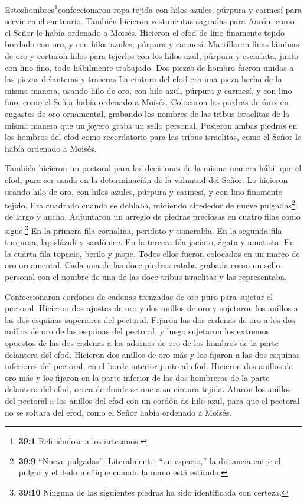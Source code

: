  Estoshombres\footnote{\textbf{39:1} Refiriéndose a los
  artesanos.}confeccionaron ropa tejida con hilos azules, púrpura y
carmesí para servir en el santuario. También hicieron vestimentas
sagradas para Aarón, como el Señor le había ordenado a Moisés.
 Hicieron el efod de lino finamente tejido bordado con oro,
y con hilos azules, púrpura y carmesí.  Martillaron finas
láminas de oro y cortaron hilos para tejerlos con los hilos azul,
púrpura y escarlata, junto con lino fino, todo hábilmente trabajado.
 Dos piezas de hombro fueron unidas a las piezas delanteras
y traseras  La cintura del efod era una pieza hecha de la
misma manera, usando hilo de oro, con hilo azul, púrpura y carmesí, y
con lino fino, como el Señor había ordenado a Moisés. 
Colocaron las piedras de ónix en engastes de oro ornamental, grabando
los nombres de las tribus israelitas de la misma manera que un joyero
graba un sello personal.  Pusieron ambas piedras en los
hombros del efod como recordatorio para las tribus israelitas, como el
Señor le había ordenado a Moisés.

 También hicieron un pectoral para las decisiones de la
misma manera hábil que el efod, para ser usado en la determinación de la
voluntad del Señor. Lo hicieron usando hilo de oro, con hilos azules,
púrpura y carmesí, y con lino finamente tejido.  Era
cuadrado cuando se doblaba, midiendo alrededor de nueve
pulgadas\footnote{\textbf{39:9} ``Nueve pulgadas'': Literalmente, ``un
  espacio,'' la distancia entre el pulgar y el dedo meñique cuando la
  mano está estirada.} de largo y ancho.  Adjuntaron un
arreglo de piedras preciosas en cuatro filas como sigue.\footnote{\textbf{39:10}
  Ninguna de las siguientes piedras ha sido identificada con certeza.}
En la primera fila cornalina, peridoto y esmeralda.  En la
segunda fila turquesa, lapislázuli y sardónice.  En la
tercera fila jacinto, ágata y amatista.  En la cuarta fila
topacio, berilo y jaspe. Todos ellos fueron colocados en un marco de oro
ornamental.  Cada una de las doce piedras estaba grabada
como un sello personal con el nombre de una de las doce tribus
israelitas y las representaba.

 Confeccionaron cordones de cadenas trenzadas de oro puro
para sujetar el pectoral.  Hicieron dos ajustes de oro y
dos anillos de oro y sujetaron los anillos a las dos esquinas superiores
del pectoral.  Fijaron las dos cadenas de oro a los dos
anillos de oro de las esquinas del pectoral,  y luego
sujetaron los extremos opuestos de las dos cadenas a los adornos de oro
de los hombros de la parte delantera del efod.  Hicieron
dos anillos de oro más y los fijaron a las dos esquinas inferiores del
pectoral, en el borde interior junto al efod.  Hicieron dos
anillos de oro más y los fijaron en la parte inferior de las dos
hombreras de la parte delantera del efod, cerca de donde se une a su
cintura tejida.  Ataron los anillos del pectoral a los
anillos del efod con un cordón de hilo azul, para que el pectoral no se
soltara del efod, como el Señor había ordenado a Moisés.

